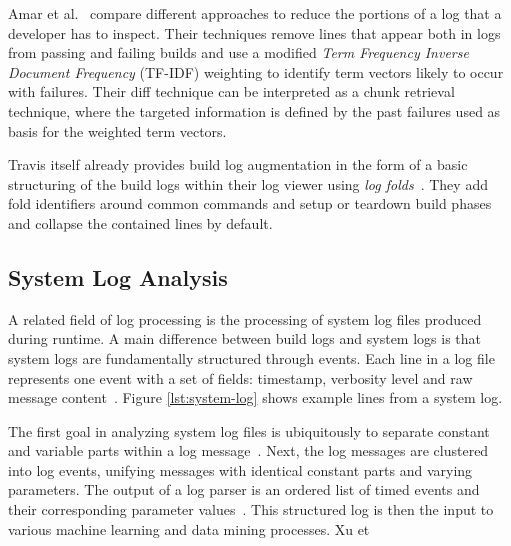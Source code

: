 Amar et al.~\cite{amar2019mining} compare different approaches to
reduce the portions of a log that a developer has to inspect.
Their
techniques remove lines that appear both in logs from passing and
failing builds and use a modified \emph{Term Frequency Inverse
Document Frequency} (TF-IDF) weighting to identify term vectors likely
to occur with failures.
Their diff technique can be interpreted as a
chunk retrieval technique, where the targeted information is defined
by the past failures used as basis for the weighted term vectors.

Travis itself already provides build log augmentation in the form of a
basic structuring of the build logs within their log viewer using
\emph{log folds}~\cite{travis2019logfolds}.
They add fold identifiers
around common commands and setup or teardown build phases and collapse
the contained lines by default.

\subsection{System Log Analysis}
\label{sec:log-analysis}
A related field of log processing is the processing of system log
files produced during runtime.
A main difference between build logs
and system logs is that system logs are fundamentally structured
through events.
Each line in a log file represents one event with a
set of fields: timestamp, verbosity level and raw message
content~\cite{he2017towards}.
Figure \ref{lst:system-log} shows
example lines from a system log.

The first goal in analyzing system log files is ubiquitously to
separate constant and variable parts within a log
message~\cite{nagappan2010abstracting,he2017towards}.
Next, the log
messages are clustered into log events, unifying messages with
identical constant parts and varying parameters.
The output of a log
parser is an ordered list of timed events and their corresponding
parameter values~\cite{he2016evaluation}.
This structured log is then
the input to various machine learning and data mining processes.
Xu et


